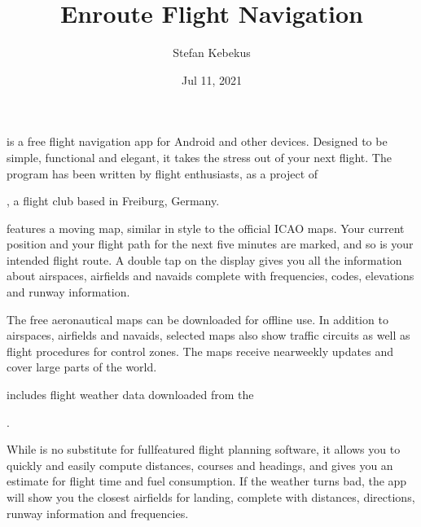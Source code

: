 \documentclass[letterpaper,10pt,english]{sphinxmanual}
\title{Enroute Flight Navigation}
\date{Jul 11, 2021}
\author{Stefan Kebekus}
\let\sphinxpxdimen\pdfpxdimen\else\newdimen\sphinxpxdimen
\begin{document}
\pagestyle{empty}
\sphinxmaketitle
\pagestyle{plain}
\sphinxtableofcontents
\pagestyle{normal}
\label{\detokenize{index::doc}}


\noindent{\hspace*{\fill}\sphinxincludegraphics[width=100\sphinxpxdimen]{{de.akaflieg_freiburg.enroute}.png}\hspace*{\fill}}

\sphinxAtStartPar
{} is a free flight navigation app for Android and
other devices.  Designed to be simple, functional and elegant, it takes the
stress out of your next flight. The program has been written by flight
enthusiasts, as a project of %
\begin{footnote}[1]\sphinxAtStartFootnote
{}
%
\end{footnote}, a flight club based in Freiburg, Germany.

\sphinxAtStartPar
{} features a moving map, similar in style to the
official ICAO maps. Your current position and your flight path for the next five
minutes are marked, and so is your intended flight route. A double tap on the
display gives you all the information about airspaces, airfields and navaids \textendash{}
complete with frequencies, codes, elevations and runway information.

\sphinxAtStartPar
The free aeronautical maps can be downloaded for offline use. In addition to
airspaces, airfields and navaids, selected maps also show traffic circuits as
well as flight procedures for control zones. The maps receive near\sphinxhyphen{}weekly
updates and cover large parts of the world.

\sphinxAtStartPar
{} includes flight weather data downloaded from the
%
\begin{footnote}[2]\sphinxAtStartFootnote
{}
%
\end{footnote}.

\sphinxAtStartPar
While  is no substitute for full\sphinxhyphen{}featured flight
planning software, it allows you to quickly and easily compute distances,
courses and headings, and gives you an estimate for flight time and fuel
consumption. If the weather turns bad, the app will show you the closest
airfields for landing, complete with distances, directions, runway information
and frequencies.
\end{document}
